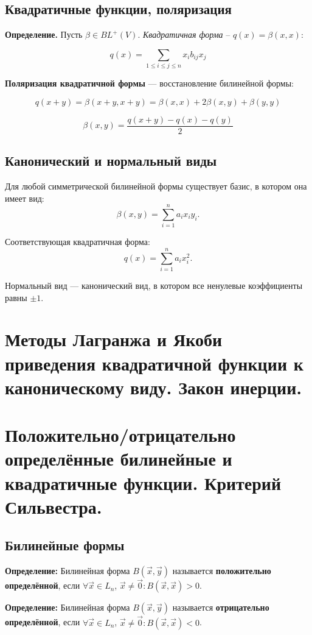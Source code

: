 \documentclass[12pt]{article}
\begin{document}
\subsection{Квадратичные функции, поляризация}

\textbf{Определение.} Пусть $\beta \in BL^+(V).$ \textit{Квадратичная форма} – $q(x)=\beta(x,x)$:

$$
q(x) =\sum_{1 \leq i \leq j \leq n}{x_i b_{ij}x_j}
$$

\textbf{Поляризация квадратичной формы} — восстановление билинейной формы:

$$
q(x + y) = \beta(x + y, x + y)
         = \beta(x, x) + 2\beta(x, y) + \beta(y, y)
$$

$$
\beta(x, y) = \frac{q(x + y) - q(x) - q(y)}{2}
$$

\subsection{Канонический и нормальный виды}

Для любой симметрической билинейной формы существует базис, в котором она имеет вид:
$$
\beta(x, y) = \sum_{i=1}^n a_i x_i y_i.
$$

Соответствующая квадратичная форма:
$$
q(x) = \sum_{i=1}^n a_i x_i^2.
$$

Нормальный вид — канонический вид, в котором все ненулевые коэффициенты равны $\pm 1$.

\section{Методы Лагранжа и Якоби приведения квадратичной функции к каноническому виду. Закон инерции.}

\section{Положительно/отрицательно определённые билинейные и квадратичные функции. Критерий Сильвестра.}

\subsection*{Билинейные формы}

\textbf{Определение:} Билинейная форма $B(\vec{x}, \vec{y})$ называется \textbf{положительно определённой}, если $\forall \vec{x} \in L_n$, $\vec{x} \neq \vec{0}: B(\vec{x}, \vec{x}) > 0$.

\textbf{Определение:} Билинейная форма $B(\vec{x}, \vec{y})$ называется \textbf{отрицательно определённой}, если $\forall \vec{x} \in L_n$, $\vec{x} \neq \vec{0}: B(\vec{x}, \vec{x}) < 0$.
\end{document}
